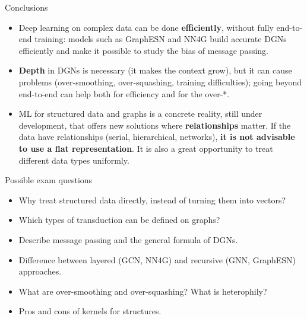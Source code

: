 \begin{boxabstract}{Conclusions}

\begin{itemize}
\tightlist
\item
  Deep learning on complex data can be done \textbf{efficiently},
  without fully end-to-end training: models such as GraphESN and NN4G
  build accurate DGNs efficiently and make it possible to study the
  bias of message passing.
\item
  \textbf{Depth} in DGNs is necessary (it makes the context grow), but
  it can cause problems (over-smoothing, over-squashing, training
  difficulties); going beyond end-to-end can help both for efficiency
  and for the over-*.
\item
  ML for structured data and graphs is a concrete reality, still under
  development, that offers new solutions where \textbf{relationships}
  matter. If the data have relationships (serial, hierarchical,
  networks), \textbf{it is not advisable to use a flat
  representation}. It is also a great opportunity to treat different
  data types uniformly.
\end{itemize}

\end{boxabstract}

\begin{boxquestion}{Possible exam questions}

\begin{itemize}
\tightlist
\item
  Why treat structured data directly, instead of turning them into
  vectors?
\item
  Which types of transduction can be defined on graphs?
\item
  Describe message passing and the general formula of DGNs.
\item
  Difference between layered (GCN, NN4G) and recursive (GNN, GraphESN)
  approaches.
\item
  What are over-smoothing and over-squashing? What is heterophily?
\item
  Pros and cons of kernels for structures.
\end{itemize}

\end{boxquestion}
